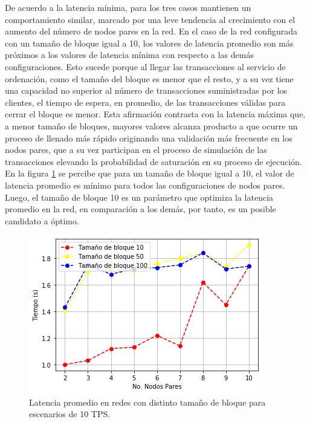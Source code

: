De acuerdo a la latencia m\'inima, para los tres casos mantienen un comportamiento similar, marcado por una leve tendencia al crecimiento con el aumento del n\'umero de nodos pares en la red. En el caso de la red configurada con un tama\~no de bloque igual a 10, los valores de latencia promedio son m\'as pr\'oximos a los valores de latencia m\'inima con respecto a las dem\'as configuraciones. Esto sucede porque al llegar las transacciones al servicio de ordenaci\'on, como el tama\~no del bloque es menor que el resto, y a su vez tiene una capacidad no superior al n\'umero de transacciones suministradas por los clientes, el tiempo de espera, en promedio, de las transacciones v\'alidas para cerrar el bloque es menor. Esta afirmaci\'on contrasta con la latencia m\'axima que, a menor tama\~no de bloques, mayores valores alcanza producto a que ocurre un proceso de llenado m\'as r\'apido originando una validaci\'on m\'as frecuente en los nodos pares, que a su vez participan en el proceso de simulaci\'on de las transacciones elevando la probabilidad de saturaci\'on en su proceso de ejecuci\'on.\\

En la figura \ref{ComparacionLatencia10TPS} se percibe que para un tama\~no de bloque igual a 10, el valor de latencia promedio es m\'inimo para todos las configuraciones de nodos pares. Luego, el tama\~no de bloque 10 es un par\'ametro que optimiza la latencia promedio en la red, en comparaci\'on a los dem\'as, por tanto, es un posible candidato a \'optimo.\\

\begin{figure}[h]
\centering
\includegraphics[scale=0.5]{Graphics/ComparacionLatencia10TPS.png}
\caption{Latencia promedio en redes con distinto tama\~no de bloque para escenarios de 10 TPS.}
\label{ComparacionLatencia10TPS}
\end{figure}


